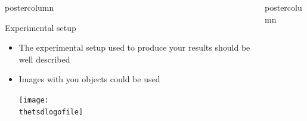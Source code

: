 \documentclass[final,hyperref={pdfpagelabels=false}]{beamer}
\newlength{\columnheight}
\begin{document}
\begin{frame}
\begin{columns}
\begin{column}{.49\textwidth}
\begin{beamercolorbox}[center,wd=\textwidth]{postercolumn}
\begin{minipage}[T]{.95\textwidth}
{\begin{block}{Experimental setup}
              \begin{itemize}
              \item The experimental setup used to produce your results should
                be well described
              \item Images with you objects could be used
                \begin{center}
                  \texttt{[image: \\thetsdlogofile]}
                \end{center}
              \end{itemize}
            \end{block}
          } %
        \end{minipage}
      \end{beamercolorbox}
    \end{column}

    \begin{column}{.49\textwidth}
      \begin{beamercolorbox}[center,wd=\textwidth]{postercolumn}
        \begin{minipage}[T]{.95\textwidth} %
          \parbox[t][\columnheight]{\textwidth}{ %
            
}
\end{minipage}
\end{beamercolorbox}
\end{column}
\end{columns}
\end{frame}
\end{document}
